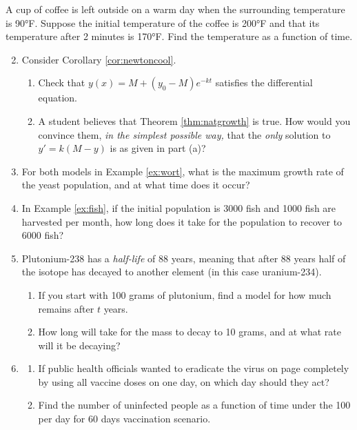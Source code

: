 \begin{exercises}
\exstart A cup of coffee is left outside on a warm day when the surrounding temperature is \ang{90}F. Suppose the initial temperature of the coffee is \ang{200}F and that its temperature after 2 minutes is \ang{170}F. Find the temperature as a function of time.

\begin{enumerate}\setcounter{enumi}{1}
  \item Consider Corollary \ref{cor:newtoncool}.
	\begin{enumerate}
	  \item Check that $y(x)=M+(y_0-M)e^{-kt}$ satisfies the differential equation.
	  \item A student believes that Theorem \ref{thm:natgrowth} is true. How would you convince them, \emph{in the simplest possible way,} that the \emph{only} solution to $y'=k(M-y)$ is as given in part (a)?
	\end{enumerate}

	
	\item For both models in Example \ref{ex:wort}, what is the maximum growth rate of the yeast population, and at what time does it occur?
	

	\item In Example \ref{ex:fish}, if the initial population is 3000 fish and 1000 fish are harvested per month, how long does it take for the population to recover to 6000 fish?
	
	
  \item Plutonium-238 has a \emph{half-life} of 88 years, meaning that after 88 years half of the isotope has decayed to another element (in this case uranium-234).
  \begin{enumerate}
  	\item If you start with 100 grams of plutonium, find a model for how much remains after $t$ years.
  	\item How long will take for the mass to decay to 10 grams, and at what rate will it be decaying? 
  \end{enumerate}
  
	
	\item\begin{enumerate}
	  \item If public health officials wanted to eradicate the virus on page \pageref{pg:virus} completely by using all vaccine doses on one day, on which day should they act?
	  \item Find the number of uninfected people as a function of time under the 100 per day for 60 days vaccination scenario.
	\end{enumerate}
\end{enumerate}
\end{exercises}
